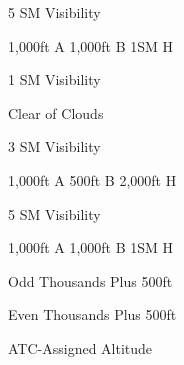 \documentclass{article}
\begin{document}
\begin{multicols*}{2}

    \begin{notelist}
      \item 5 SM Visibility
      \item 1,000ft A 1,000ft B 1SM H
    \end{notelist}



    \begin{notelist}
      \item 1 SM Visibility
      \item Clear of Clouds
    \end{notelist}


    \begin{notelist}
      \item 3 SM Visibility
      \item 1,000ft A 500ft B 2,000ft H
    \end{notelist}


    \begin{notelist}
      \item 5 SM Visibility
      \item 1,000ft A 1,000ft B 1SM H
    \end{notelist}




    \begin{notelist}
      \item Odd Thousands Plus 500ft
    \end{notelist}


    \begin{notelist}
      \item Even Thousands Plus 500ft
    \end{notelist}


    \begin{notelist}
      \item ATC-Assigned Altitude
    \end{notelist}


    \begin{clitemize}
    \end{clitemize}

  \end{multicols*}
\end{document}
